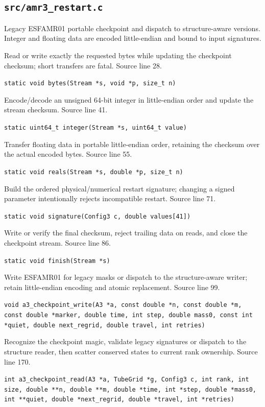 \subsection{\texttt{src/amr3\_restart.c}}
Legacy ESFAMR01 portable checkpoint and dispatch to structure-aware versions. Integer and floating data are encoded little-endian and bound to input signatures.
\begin{description}[style=nextline,leftmargin=0pt,labelindent=0pt,labelwidth=0pt,labelsep=0pt]
\item[\texttt{bytes}] Read or write exactly the requested bytes while updating the checkpoint checksum; short transfers are fatal. Source line 28.\par
{\small\nolinkurl{static void bytes(Stream *s, void *p, size_t n)}}
\item[\texttt{integer}] Encode/decode an unsigned 64-bit integer in little-endian order and update the stream checksum. Source line 41.\par
{\small\nolinkurl{static uint64_t integer(Stream *s, uint64_t value)}}
\item[\texttt{reals}] Transfer floating data in portable little-endian order, retaining the checksum over the actual encoded bytes. Source line 55.\par
{\small\nolinkurl{static void reals(Stream *s, double *p, size_t n)}}
\item[\texttt{signature}] Build the ordered physical/numerical restart signature; changing a signed parameter intentionally rejects incompatible restart. Source line 71.\par
{\small\nolinkurl{static void signature(Config3 c, double values[41])}}
\item[\texttt{finish}] Write or verify the final checksum, reject trailing data on reads, and close the checkpoint stream. Source line 86.\par
{\small\nolinkurl{static void finish(Stream *s)}}
\item[\texttt{a3\_checkpoint\_write}] Write ESFAMR01 for legacy masks or dispatch to the structure-aware writer; retain little-endian encoding and atomic replacement. Source line 99.\par
{\small\nolinkurl{void a3_checkpoint_write(A3 *a, const double *n, const double *m, const double *marker, double time, int step, double mass0, const int *quiet, double next_regrid, double travel, int retries)}}
\item[\texttt{a3\_checkpoint\_read}] Recognize the checkpoint magic, validate legacy signatures or dispatch to the structure reader, then scatter conserved states to current rank ownership. Source line 170.\par
{\small\nolinkurl{int a3_checkpoint_read(A3 *a, TubeGrid *g, Config3 c, int rank, int size, double **n, double **m, double *time, int *step, double *mass0, int **quiet, double *next_regrid, double *travel, int *retries)}}
\end{description}
